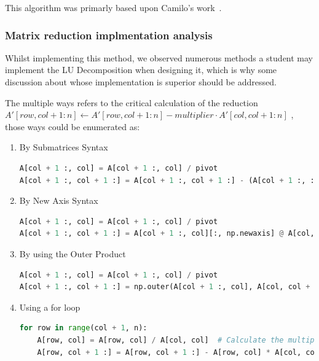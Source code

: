 This algorithm was primarly based upon Camilo's work~\cite{bucheli2020}.

\subsubsection{Matrix reduction implmentation analysis}
Whilst implementing this method, we observed numerous methods a student may implement the LU Decomposition when designing it, which is why some discussion about whose implementation is superior should be addressed.

The multiple ways refers to the critical calculation of the reduction $ A'[row, col+1:n] \gets A'[row, col+1:n] - multiplier \cdot A'[col, col+1:n] $ , those ways could be enumerated as:

\begin{enumerate}
    \item By Submatrices Syntax
    \begin{lstlisting}[language=Python]
A[col + 1 :, col] = A[col + 1 :, col] / pivot
A[col + 1 :, col + 1 :] = A[col + 1 :, col + 1 :] - (A[col + 1 :, :][:, [col]] @ A[[col], :][:, col + 1 :])
    \end{lstlisting}

    \item By New Axis Syntax
    \begin{lstlisting}[language=Python]
A[col + 1 :, col] = A[col + 1 :, col] / pivot
A[col + 1 :, col + 1 :] = A[col + 1 :, col][:, np.newaxis] @ A[col, col + 1 :][np.newaxis, :]
    \end{lstlisting}

    \item By using the Outer Product
    \begin{lstlisting}[language=Python]
A[col + 1 :, col] = A[col + 1 :, col] / pivot
A[col + 1 :, col + 1 :] = np.outer(A[col + 1 :, col], A[col, col + 1 :])
    \end{lstlisting}

    \item Using a for loop
    \begin{lstlisting}[language=Python]
for row in range(col + 1, n):
    A[row, col] = A[row, col] / A[col, col]  # Calculate the multiplier and store in A for later use
    A[row, col + 1 :] = A[row, col + 1 :] - A[row, col] * A[col, col + 1 :]  # Update the remaining elements in the row using the multiplier
    \end{lstlisting} 
\end{enumerate}

